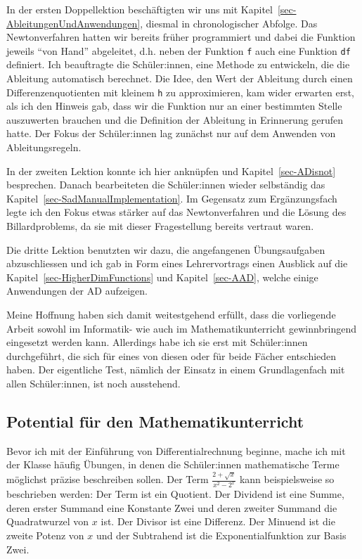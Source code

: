 \documentclass[
  a4paper,
  DIV=11]{scrreprt}
\theoremstyle{definition}
\theoremstyle{definition}
\theoremstyle{remark}
\begin{document}
In der ersten Doppellektion beschäftigten wir uns mit
Kapitel~\ref{sec-AbleitungenUndAnwendungen}, diesmal in chronologischer
Abfolge. Das Newtonverfahren hatten wir bereits früher programmiert und
dabei die Funktion jeweils ``von Hand'' abgeleitet, d.h. neben der
Funktion \texttt{f} auch eine Funktion \texttt{df} definiert. Ich
beauftragte die Schüler:innen, eine Methode zu entwickeln, die die
Ableitung automatisch berechnet. Die Idee, den Wert der Ableitung durch
einen Differenzenquotienten mit kleinem \texttt{h} zu approximieren, kam
wider erwarten erst, als ich den Hinweis gab, dass wir die Funktion nur
an einer bestimmten Stelle auszuwerten brauchen und die Definition der
Ableitung in Erinnerung gerufen hatte. Der Fokus der Schüler:innen lag
zunächst nur auf dem Anwenden von Ableitungsregeln.

In der zweiten Lektion konnte ich hier anknüpfen und
Kapitel~\ref{sec-ADisnot} besprechen. Danach bearbeiteten die
Schüler:innen wieder selbständig das
Kapitel~\ref{sec-SadManualImplementation}. Im Gegensatz zum
Ergänzungsfach legte ich den Fokus etwas stärker auf das Newtonverfahren
und die Lösung des Billardproblems, da sie mit dieser Fragestellung
bereits vertraut waren.

Die dritte Lektion benutzten wir dazu, die angefangenen Übungsaufgaben
abzuschliessen und ich gab in Form eines Lehrervortrags einen Ausblick
auf die Kapitel~\ref{sec-HigherDimFunctions} und Kapitel~\ref{sec-AAD},
welche einige Anwendungen der AD aufzeigen.

Meine Hoffnung haben sich damit weitestgehend erfüllt, dass die
vorliegende Arbeit sowohl im Informatik- wie auch im
Mathematikunterricht gewinnbringend eingesetzt werden kann. Allerdings
habe ich sie erst mit Schüler:innen durchgeführt, die sich für eines von
diesen oder für beide Fächer entschieden haben. Der eigentliche Test,
nämlich der Einsatz in einem Grundlagenfach mit allen Schüler:innen, ist
noch ausstehend.

\hypertarget{potential-fuxfcr-den-mathematikunterricht}{%
\subsection{Potential für den
Mathematikunterricht}\label{potential-fuxfcr-den-mathematikunterricht}}

Bevor ich mit der Einführung von Differentialrechnung beginne, mache ich
mit der Klasse häufig Übungen, in denen die Schüler:innen mathematische
Terme möglichst präzise beschreiben sollen. Der Term
\(\frac{2+\sqrt x}{x^2-2^x}\) kann beispielsweise so beschrieben werden:
\textbar{} Der Term ist ein Quotient. Der Dividend ist eine Summe, deren
erster Summand eine Konstante Zwei und deren zweiter Summand die
Quadratwurzel von \(x\) ist. Der Divisor ist eine Differenz. Der Minuend
ist die zweite Potenz von \(x\) und der Subtrahend ist die
Exponentialfunktion zur Basis Zwei.
\end{document}

